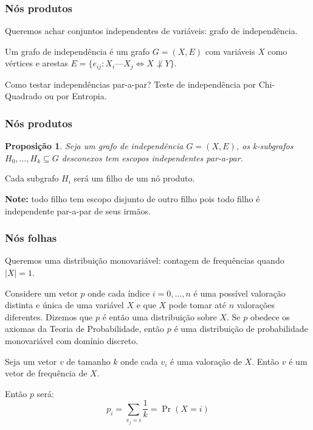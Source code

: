 \documentclass[10pt]{beamer}
\theoremstyle{plain}
\newtheorem{proposition}{Proposição}
\begin{document}
\begin{frame}
  \frametitle{Nós produtos}
  Queremos achar conjuntos independentes de variáveis: grafo de independência.

  \begin{definition}
    Um grafo de independência é um grafo $G=(X,E)$ com variáveis $X$ como vértices e arestas
    $E=\{e_{ij} : X_i\text{---}X_j \iff X \not\perp Y\}$.
  \end{definition}

  Como testar independências par-a-par? Teste de independência por Chi-Quadrado ou por Entropia.

\end{frame}

\begin{frame}
  \frametitle{Nós produtos}
  \begin{proposition}
    Seja um grafo de independência $G=(X,E)$, os k-subgrafos $H_0,\ldots,H_k \subseteq G$
    desconexos tem escopos independentes par-a-par.
  \end{proposition}

  Cada subgrafo $H_i$ será um filho de um nó produto.

  \textbf{Note:} todo filho tem escopo disjunto de outro filho pois todo filho é independente
  par-a-par de seus irmãos.
\end{frame}

\begin{frame}
  \frametitle{Nós folhas}
  Queremos uma distribuição monovariável: contagem de frequências quando $|X|=1$.

  Considere um vetor $p$ onde cada índice $i=0,\ldots,n$ é uma possível valoração distinta e única
  de uma variável $X$ e que $X$ pode tomar até $n$ valorações diferentes. Dizemos que $p$ é então
  uma distribuição sobre $X$. Se $p$ obedece os axiomas da Teoria de Probabilidade, então $p$ é uma
  distribuição de probabilidade monovariável com domínio discreto.

  Seja um vetor $v$ de tamanho $k$ onde cada $v_i$ é uma valoração de $X$. Então $v$ é um vetor de
  frequência de $X$.

  Então $p$ será:
  \begin{equation*}
    p_i = \sum_{v_j = i} \frac{1}{k} = \Pr(X=i)
  \end{equation*}
\end{frame}
\end{document}
